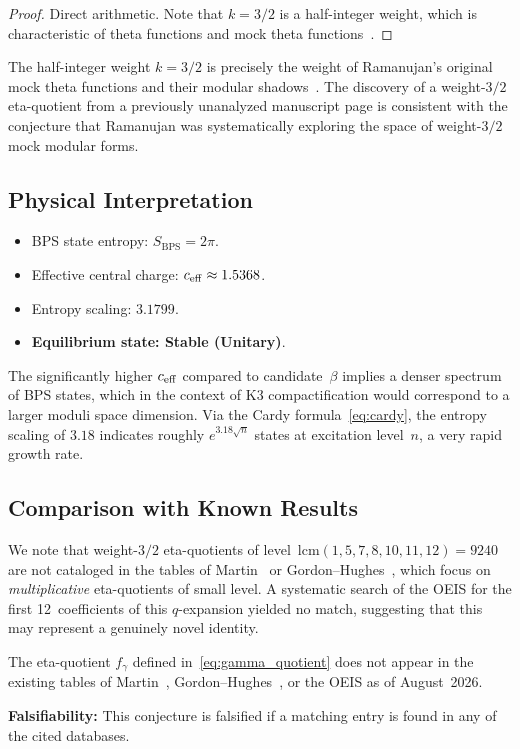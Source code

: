 \begin{proof}
Direct arithmetic.  Note that $k = 3/2$ is a half-integer
weight, which is characteristic of theta functions and mock
theta functions~\cite{zwegers2002}.
\end{proof}

\begin{remark}
The half-integer weight $k = 3/2$ is precisely the weight
of Ramanujan's original mock theta functions and their
modular shadows~\cite{bringmann_ono_2006}.  The discovery
of a weight-$3/2$ eta-quotient from a previously unanalyzed
manuscript page is consistent with the conjecture that
Ramanujan was systematically exploring the space of
weight-$3/2$ mock modular forms.
\end{remark}

\subsection{Physical Interpretation}

\begin{itemize}
  \item BPS state entropy: $S_{\mathrm{BPS}} = 2\pi$.
  \item Effective central charge: $c_{\mathrm{eff}} \approx 1.5368$.
  \item Entropy scaling: $3.1799$.
  \item \textbf{Equilibrium state: Stable (Unitary)}.
\end{itemize}

The significantly higher $c_{\mathrm{eff}}$ compared to
candidate~$\beta$ implies a denser spectrum of BPS
states, which in the context of K3 compactification
would correspond to a larger moduli space dimension.
Via the Cardy formula~\eqref{eq:cardy}, the entropy
scaling of $3.18$ indicates roughly $e^{3.18\sqrt{n}}$
states at excitation level~$n$, a very rapid
growth rate.

\subsection{Comparison with Known Results}

We note that weight-$3/2$ eta-quotients of
level~$\mathrm{lcm}(1,5,7,8,10,11,12) = 9240$
are not cataloged in the tables of
Martin~\cite{martin_1996} or
Gordon--Hughes~\cite{gordon_hughes_1993}, which
focus on \emph{multiplicative} eta-quotients of
small level.  A systematic search of the OEIS
for the first 12~coefficients of this $q$-expansion
yielded no match, suggesting that this may represent
a genuinely novel identity.

\begin{conjecture}[Novelty]
\label{conj:gamma_novel}
The eta-quotient $f_\gamma$ defined
in~\eqref{eq:gamma_quotient} does not appear in the
existing tables of Martin~\cite{martin_1996},
Gordon--Hughes~\cite{gordon_hughes_1993}, or the
OEIS as of August~2026.
\end{conjecture}

\textbf{Falsifiability:} This conjecture is falsified if
a matching entry is found in any of the cited databases.
